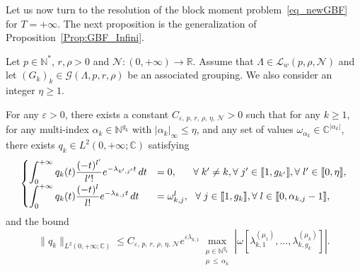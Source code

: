 \documentclass[AHL,Unicode,longabstracts]{cedram}
\newcommand{\llbracket}{\mathopen{[\mkern -2.7mu[}}
\newcommand{\rrbracket}{\mathclose{]\mkern -2.7mu]}}
\newcommand{\inter}[2]{\llbracket #1,#2 \rrbracket}
\newcommand{\n}{g}
\newcommand{\LL}{\mathcal{L}}
\newcommand{\NN}{\mathcal{N}}
\newcommand{\N}{\mathbb{N}}
\newcommand{\R}{\mathbb{R}}
\newcommand{\C}{\mathbb{C}}
\let\oldforall\forall
\renewcommand*{\forall}{\mathrel{\oldforall}}
\begin{document}
Let us now turn to the resolution of the block moment problem~\eqref{eq_newGBF} for $T=+\infty$. The next proposition is the generalization of Proposition~\ref{Prop:GBF_Infini}.

\begin{prop}\label{Prop:newGBF_Infini}
Let $p \in \N^*$, $r, \rho > 0$ and $\NN : (0,+\infty) \to \R$. Assume that $\Lambda \in \LL_w(p,\rho, \NN)$ and let $(G_k)_k\in \mathcal{G}(\Lambda,p,r,\rho)$ be an associated grouping. We also consider an integer $\eta\geq 1$.

For any $\varepsilon > 0$, there exists a constant $C_{\varepsilon,\, p, \,r, \,\rho,\, \eta,\, \NN} >0$ such that for any $k \geq 1$, for any multi-index $\alpha_k\in \N^{\n_k}$ with $|\alpha_k|_\infty\leq \eta$, and any set of values $\omega_{\alpha_k} \in \C^{|\alpha_k|}$, there exists $q_k \in L^2(0,+\infty; \C)$ satisfying
\begin{equation*}\label{eq_newGBF_Infini}
\begin{cases}
\displaystyle\int_0^{+\infty} q_k(t) \frac{(-t)^{l'}}{l'!} e^{-\lambda_{k',j'}t} \, dt & = 0, \mkern30mu \forall k'\neq k, \forall j'\in \inter{1}{\n_{k'}}, \forall l'\in \inter{0}{\eta},\\[0.15em]
\displaystyle\int_0^{+\infty} q_k(t) \frac{(-t)^l}{l!} e^{-\lambda_{k,j}t} \, dt & = \omega_{k,j}^l, \ \ \forall j\in \inter{1}{\n_{k}}, \forall l\in \inter{0}{\alpha_{k,j}-1},\\
\end{cases}
\end{equation*}
and the bound
\begin{equation}\label{bound_qk_multiplicities_Infini}
\|q_k\|_{L^2(0,+\infty;\C)}\leq C_{\varepsilon,\, p,\, r,\, \rho,\, \eta,\, \NN} e^{\varepsilon \lambda_{k,1}} \max\limits_{\substack{\mu\in \N^{\n_k} \\ \mu\,\leq\,\alpha_k}} \left| \omega\left[\lambda_{k,1}^{(\mu_1)},\dotsc,\lambda_{k,\n_k}^{(\mu_k)}\right] \right|.
\end{equation}
\end{prop}
\end{document}
